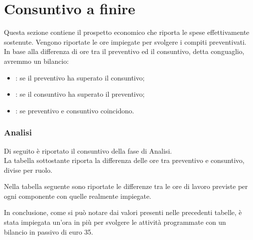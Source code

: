 \section{Consuntivo a finire}
Questa sezione contiene il prospetto economico che riporta le spese effettivamente sostenute. Vengono riportate le ore impiegate per svolgere i compiti preventivati. In base alla differenza di ore tra il preventivo ed il consuntivo, detta conguaglio, avremmo un bilancio:
\begin{itemize}
\item {}: se il preventivo ha superato il consuntivo;
\item {}: se il consuntivo ha superato il preventivo;
\item {}: se preventivo e consuntivo coincidono.
\end{itemize}
\subsubsection{Analisi}
Di seguito è riportato il consuntivo della fase di Analisi.\\
La tabella sottostante riporta la differenza delle ore tra preventivo e consuntivo, divise per ruolo.


Nella tabella seguente sono riportate le differenze tra le ore di lavoro previste per ogni componente con quelle realmente impiegate.


In conclusione, come si può notare dai valori presenti nelle precedenti tabelle, è stata impiegata un'ora in più per svolgere le attività programmate con un bilancio in passivo di euro 35.


